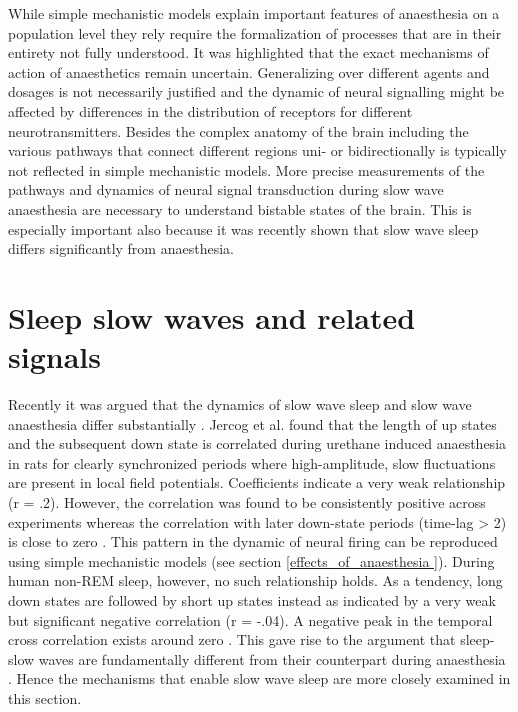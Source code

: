 While simple mechanistic models explain important features of anaesthesia on a population level they rely require the formalization of processes that are in their entirety not fully understood. It was highlighted that the exact mechanisms of action of anaesthetics remain uncertain. Generalizing over different agents and dosages is not necessarily justified and the dynamic of neural signalling might be affected by differences in the distribution of receptors for different neurotransmitters. Besides the complex anatomy of the brain including the various pathways that connect different regions uni- or bidirectionally is typically not reflected in simple mechanistic models. More precise measurements of the pathways and dynamics of neural signal transduction during slow wave anaesthesia are necessary to understand bistable states of the brain. This is especially important also because it was recently shown that slow wave sleep differs significantly from anaesthesia.

\section{Sleep slow waves and related signals}
\label{slow_waves_anaesthesia_sleep}
Recently it was argued that the dynamics of slow wave sleep and slow wave anaesthesia differ substantially \parencite{nghiem2018two}. Jercog et al. \parencite*{jercog2017up} found that the length of up states and the subsequent down state is correlated during urethane induced anaesthesia in rats for clearly synchronized periods where high-amplitude, slow fluctuations are present in local field potentials. Coefficients indicate a very weak relationship (r = .2). However, the correlation was found to be consistently positive across experiments whereas the correlation with later down-state periods (time-lag > 2) is close to zero \parencite{jercog2017up}. This pattern in the dynamic of neural firing can be reproduced using simple mechanistic models (see section \ref{effects_of_anaesthesia }). During human non-REM sleep, however, no such relationship holds. As a tendency, long down states are followed by short up states instead as indicated by a very weak but significant negative correlation (r = -.04). A negative peak in the temporal cross correlation exists around zero \parencite{nghiem2018two}. This gave rise to the argument that sleep-slow waves are fundamentally different from their counterpart during anaesthesia \parencite{nghiem2018two}. Hence the mechanisms that enable slow wave sleep are more closely examined in this section. \\


